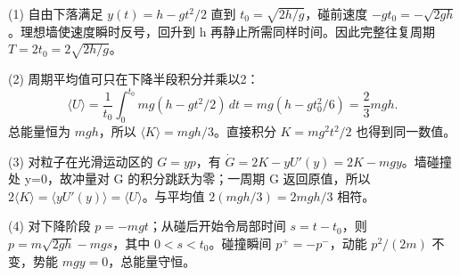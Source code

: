 (1) 自由下落满足 \(y(t)=h-gt^2/2\) 直到 \(t_0=\sqrt{2h/g}\)，碰前速度 \(-gt_0=-\sqrt{2gh}\)。理想墙使速度瞬时反号，回升到 h 再静止所需同样时间。因此完整往复周期 \(T=2t_0=2\sqrt{2h/g}\)。

(2) 周期平均值可只在下降半段积分并乘以2：
\[
\langle U\rangle=\frac1{t_0}\int_0^{t_0}mg(h-gt^2/2)\,dt
=mg(h-gt_0^2/6)=\frac23mgh.
\]
总能量恒为 \(mgh\)，所以 \(\langle K\rangle=mgh/3\)。直接积分 \(K=mg^2t^2/2\) 也得到同一数值。

(3) 对粒子在光滑运动区的 \(G=yp\)，有 \(\dot G=2K-yU'(y)=2K-mgy\)。墙碰撞处 y=0，故冲量对 G 的积分跳跃为零；一周期 G 返回原值，所以 \(2\langle K\rangle=\langle yU'(y)\rangle=\langle U\rangle\)。与平均值 \(2(mgh/3)=2mgh/3\) 相符。

(4) 对下降阶段 \(p=-mgt\)；从碰后开始令局部时间 \(s=t-t_0\)，则 \(p=m\sqrt{2gh}-mgs\)，其中 \(0<s<t_0\)。碰撞瞬间 \(p^+=-p^-\)，动能 \(p^2/(2m)\) 不变，势能 \(mgy=0\)，总能量守恒。
